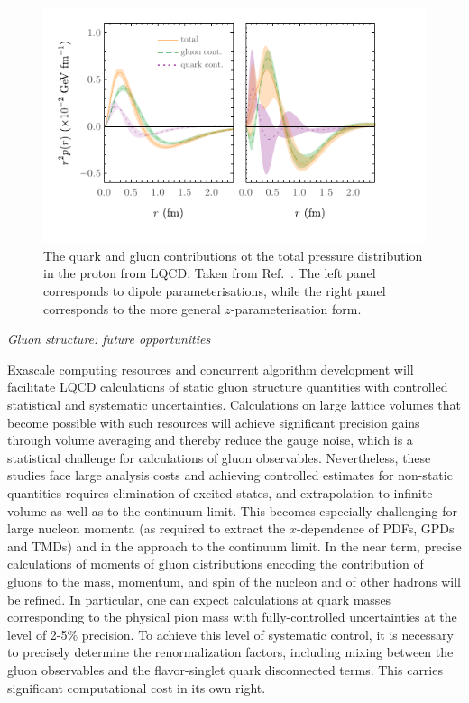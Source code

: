 \begin{figure}
	\centering
	\includegraphics[width=0.95\columnwidth]{figures/combinedpressurelattnew.pdf}
	\caption{The quark and gluon contributions ot the total pressure distribution in the proton from LQCD. Taken from Ref.~\cite{Shanahan:2018pib}. The left panel corresponds to dipole parameterisations, while the right panel corresponds to the more general $z$-parameterisation form.}
	\label{gluefig}
\end{figure}



{\it Gluon structure: future opportunities}

Exascale computing resources and concurrent algorithm development will facilitate LQCD calculations of static gluon structure quantities with controlled statistical and systematic uncertainties. Calculations on  large lattice volumes that become possible with such resources  will achieve significant precision gains through volume averaging and thereby reduce the gauge noise, which is a statistical challenge for calculations of gluon observables. Nevertheless, these studies face large analysis costs and achieving controlled estimates for non-static quantities requires elimination of excited states, and extrapolation to infinite volume as well as to the continuum limit. 
This becomes especially challenging for large nucleon momenta (as required to extract the $x$-dependence of PDFs, GPDs and TMDs) and in the approach to the continuum limit. 
%
In the near term, precise calculations of moments of gluon distributions encoding the contribution of gluons to the mass, momentum, and spin of the nucleon and of other hadrons will be refined. In particular, one can expect calculations at quark masses corresponding to the physical pion mass with fully-controlled uncertainties at the level of 2-5\% precision. To achieve this level of systematic control, it is necessary to precisely determine the renormalization factors, including mixing between the gluon observables and the flavor-singlet quark disconnected terms. This carries significant computational cost in its own right.\\
 

